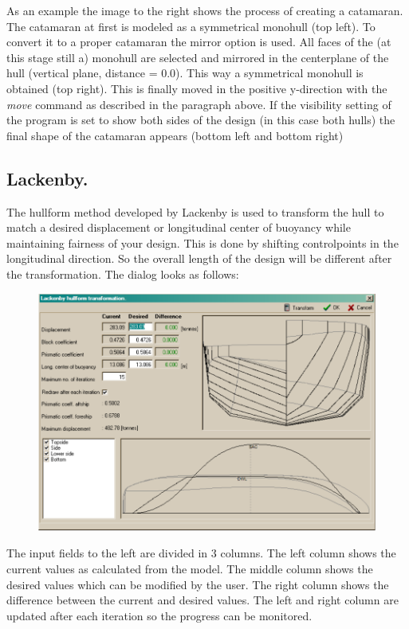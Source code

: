 \documentclass[12pt]{article}
\begin{document}
As an example the image to the right shows the process of creating a
catamaran. The catamaran at first is modeled as a symmetrical monohull
(top left). To convert it to a proper catamaran the mirror option is
used. All faces of the (at this stage still a) monohull are selected
and mirrored in the centerplane of the hull (vertical plane, distance
= 0.0). This way a symmetrical monohull is obtained (top right). This
is finally moved in the positive y-direction with the \textit{move} command as
described in the paragraph above. If the visibility setting of the
program is set to show both sides of the design (in this case both
hulls) the final shape of the catamaran appears (bottom left and
bottom right)

\subsection{Lackenby.}
The hullform method developed by Lackenby is used to transform the
hull to match a desired displacement or longitudinal center of
buoyancy while maintaining fairness of your design. This is done by
shifting controlpoints in the longitudinal direction. So the overall
length of the design will be different after the transformation. The
dialog looks as follows:

\begin{figure}[h]
        \centering
        \includegraphics[width=15cm,natwidth=881,natheight=620]{lackenbydialog.png}
        \caption{}
        \label{fig:lackenby}
\end{figure}

The input fields to the left are divided in 3 columns. The left column
shows the current values as calculated from the model. The middle
column shows the desired values which can be modified by the user. The
right column shows the difference between the current and desired
values. The left and right column are updated after each iteration so
the progress can be monitored.
\end{document}
